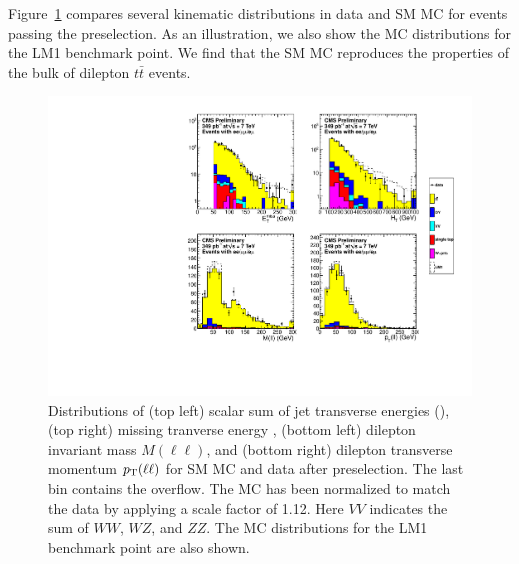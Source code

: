 
Figure~\ref{fig:bulk} compares several kinematic distributions in data and SM MC for events passing the preselection.
As an illustration, we also show the MC distributions for the LM1 benchmark point. We find that the SM MC reproduces 
the properties of the bulk of dilepton $t\bar{t}$ events. 


\begin{figure}[tbh]
\begin{center}
\includegraphics[width=1.0\linewidth]{plots_final/datamc_LM1_349pb.pdf}
\caption{\label{fig:bulk}\protect 
Distributions of (top left) scalar sum of jet transverse energies (\HT), (top right) missing tranverse energy \MET, 
(bottom left) dilepton invariant mass $M(\ell\ell)$, and (bottom right) dilepton transverse momentum $p_{\mathrm{T}}(\ell\ell)$ 
for SM MC and data after preselection. The last bin contains the overflow.
The MC has been normalized to match the data by applying a scale factor of 1.12.
Here $VV$ indicates the sum of $WW$, $WZ$, and $ZZ$. 
The MC distributions for the LM1 benchmark point are also shown.
}
\end{center}
\end{figure}
